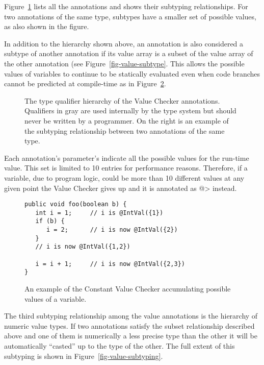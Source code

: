 Figure~\ref{fig-value-hierarchy} lists all the annotations and shows their
subtyping relationships.
For two annotations of the same type, subtypes have a smaller set of
possible values, as also shown in the figure.

In addition to the hierarchy shown above, an annotation is also
considered a subtype of another annotation if its value array is a
subset of the value array of the other annotation (see
Figure~\ref{fig-value-subtype}. This allows the possible values of
variables to continue to be statically evaluated even when code branches cannot be
predicted at compile-time as in Figure~\ref{fig-value-multivalue}.


\begin{figure}
\begin{center}
\qquad\qquad
{}
\vspace{-1.5\baselineskip}
\end{center}

\caption{The type qualifier hierarchy of the Value Checker
annotations. Qualifiers in gray are used
internally by the type system but should never be written by a
programmer.  On the right is an example of the subtyping relationship
between two annotations of the same type.}
\label{fig-value-hierarchy}
\end{figure}

Each annotation's parameter's indicate all the possible values for the
run-time value.  This set is limited to 10 entries for
performance reasons. Therefore, if a variable, due to program logic,
could be more than 10 different values at any given point the Value
Checker gives up and it is annotated as
\<@> instead.

\begin{figure}
\begin{Verbatim}
public void foo(boolean b) {
   int i = 1;     // i is @IntVal({1})
   if (b) {  
      i = 2;      // i is now @IntVal({2})
   }        
   // i is now @IntVal({1,2})
   
   i = i + 1;     // i is now @IntVal({2,3})
}
\end{Verbatim}
\caption{An example of the Constant Value Checker accumulating possible values
    of a variable.}
\label{fig-value-multivalue}
\end{figure}

The third subtyping relationship among the value annotations is the
hierarchy of numeric value types. If two annotations satisfy the
subset relationship described above and one of them is numerically a
less precise type than the other it will be automatically ``casted''
up to the type of the other. The full extent of this subtyping is
shown in Figure~\ref{fig-value-subtyping}.

